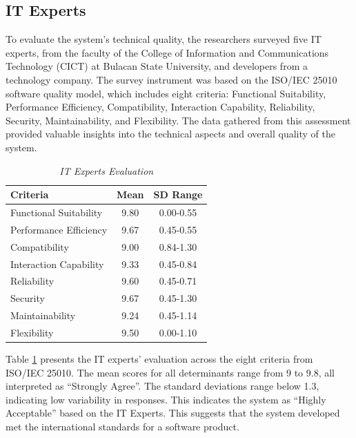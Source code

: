 \subsection{IT Experts}
	To evaluate the system’s technical quality, the researchers surveyed five IT experts, from the faculty of the College of Information and Communications Technology (CICT) at Bulacan State University, and developers from a technology company. The survey instrument was based on the ISO/IEC 25010 software quality model, which includes eight criteria: Functional Suitability, Performance Efficiency, Compatibility, Interaction Capability, Reliability, Security, Maintainability, and Flexibility. The data gathered from this assessment provided valuable insights into the technical aspects and overall quality of the system.
	
	\begin{table}[h!]
		\centering
		\caption{\textit{IT Experts Evaluation}}
		\label{itexpeval}
		\renewcommand{\arraystretch}{1.3}
			\begin{tabular}{p{5cm}cc}
				\hline
				\textbf{Criteria} & \textbf{Mean} & \textbf{SD Range} \\
				\hline
				Functional Suitability 
				& 9.80 & 0.00-0.55  \\
				Performance Efficiency
				& 9.67 & 0.45-0.55  \\
				Compatibility
				& 9.00 & 0.84-1.30  \\
				Interaction Capability
				& 9.33 & 0.45-0.84  \\
				Reliability
				& 9.60 & 0.45-0.71  \\
				Security
				& 9.67 & 0.45-1.30  \\
				Maintainability
				& 9.24 & 0.45-1.14  \\
				Flexibility
				& 9.50 & 0.00-1.10  \\
				\hline
			\end{tabular}
		
	\end{table}
	
    Table \ref{itexpeval} presents the IT experts' evaluation across the eight criteria from ISO/IEC 25010. The mean scores for all determinants range from 9 to 9.8, all interpreted as “Strongly Agree”. The standard deviations range below 1.3, indicating low variability in responses. This indicates the system as “Highly Acceptable” based on the IT Experts. This suggests that the system developed met the international standards for a software product.

